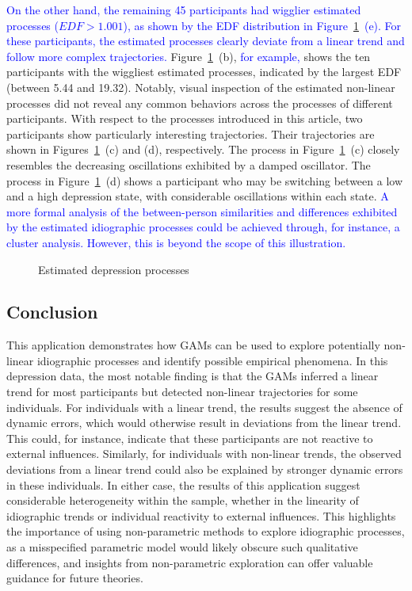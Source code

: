 \documentclass[man, floatsintext]{apa7}
\begin{document}
\textcolor{blue}{ On the other hand, the remaining 45 participants had wigglier
  estimated processes ($EDF > 1.001$), as shown by the EDF distribution in
  Figure~\ref{fig:dem_smooth}~(e). For these participants, the estimated
  processes clearly deviate from a linear trend and follow more complex
  trajectories. } Figure~\ref{fig:dem_smooth}~(b), \textcolor{blue}{for
  example,} shows the ten participants with the wiggliest estimated processes,
indicated by the largest EDF (between 5.44 and 19.32). Notably, visual
inspection of the estimated non-linear processes did not reveal any common
behaviors across the processes of different participants. With respect to the
processes introduced in this article, two participants show particularly
interesting trajectories. Their trajectories are shown in
Figures~\ref{fig:dem_smooth}~(c) and (d), respectively. The process in
Figure~\ref{fig:dem_smooth}~(c) closely resembles the decreasing oscillations
exhibited by a damped oscillator. The process in
Figure~\ref{fig:dem_smooth}~(d) shows a participant who may be switching
between a low and a high depression state, with considerable oscillations
within each state. \textcolor{blue}{A more formal analysis of the
  between-person similarities and differences exhibited by the estimated
  idiographic processes could be achieved through, for instance, a cluster
  analysis. However, this is beyond the scope of this illustration. }

\begin{figure}[!t]
  \caption{Estimated depression processes}
  \label{fig:dem_smooth}
\end{figure}

\subsection{Conclusion}

This application demonstrates how GAMs can be used to explore potentially
non-linear idiographic processes and identify possible empirical phenomena. In
this depression data, the most notable finding is that the GAMs inferred a
linear trend for most participants but detected non-linear trajectories for
some individuals. For individuals with a linear trend, the results suggest the
absence of dynamic errors, which would otherwise result in deviations from the
linear trend. This could, for instance, indicate that these participants are
not reactive to external influences. Similarly, for individuals with non-linear
trends, the observed deviations from a linear trend could also be explained by
stronger dynamic errors in these individuals. In either case, the results of
this application suggest considerable heterogeneity within the sample, whether
in the linearity of idiographic trends or individual reactivity to external
influences. This highlights the importance of using non-parametric methods to
explore idiographic processes, as a misspecified parametric model would likely
obscure such qualitative differences, and insights from non-parametric
exploration can offer valuable guidance for future theories.
\end{document}
